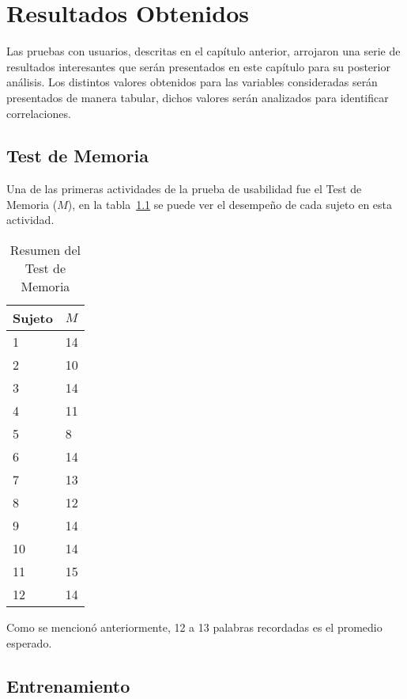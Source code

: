 \chapter{Resultados Obtenidos}
\label{sec:resultados}


Las pruebas con usuarios, descritas en el cap\'itulo anterior, arrojaron una serie de
resultados interesantes que ser\'an presentados en este cap\'itulo para su posterior an\'alisis. Los
distintos valores obtenidos para las variables consideradas ser\'an presentados de manera tabular, dichos
valores ser\'an analizados para identificar correlaciones.


\section{Test de Memoria}

Una de las primeras actividades de la prueba de usabilidad fue el Test de Memoria ($M$), en la tabla~\ref{sec:tabla-memoria}
se puede ver el desempe\~no de cada sujeto en esta actividad.

\begin{table}[H]
\centering
\footnotesize
\begin{tabular}{|p{1.6cm}|p{1.6cm}|}
\hline
    Sujeto & $M$ \\
    \hline 
    1 & 14 \\
    2 & 10 \\
    3 & 14 \\
    4 & 11 \\
    5 & 8 \\
    6 & 14 \\
    7 & 13 \\
    8 & 12 \\
    9 & 14 \\
    10 & 14 \\
    11 & 15 \\
    12 & 14 \\
\hline
\end{tabular}
\caption{Resumen del Test de Memoria}
\label{sec:tabla-memoria}
\end{table}

Como se mencion\'o anteriormente, 12 a 13 palabras recordadas es el promedio esperado. 
 
\section{Entrenamiento}

